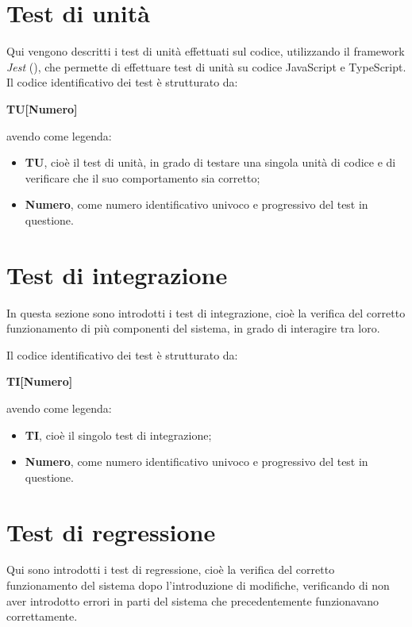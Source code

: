 \section{Test di unità}\label{sec:verifica-validazione-test}

Qui vengono descritti i test di unità effettuati sul codice, utilizzando il framework \textit{Jest} (\cite{site:jest}), che permette di effettuare test di unità su codice JavaScript e TypeScript.
Il codice identificativo dei test è strutturato da:
\begin{center}
    \textbf{TU[Numero]}
  \end{center}
\textbf{}
avendo come legenda:
\begin{itemize}
\item \textbf{TU}, cioè il test di unità, in grado di testare una singola unità di codice e di verificare che il suo comportamento sia corretto;
\item \textbf{Numero}, come numero identificativo univoco e progressivo del test in questione.
\end{itemize}

\section{Test di integrazione}\label{sec:verifica-validazione-integrazione}

In questa sezione sono introdotti i test di integrazione, cioè la verifica del corretto funzionamento di più componenti del sistema, in grado di interagire tra loro.

Il codice identificativo dei test è strutturato da:
\begin{center}
    \textbf{TI[Numero]}
  \end{center}
\textbf{}
avendo come legenda:
\begin{itemize}
\item \textbf{TI}, cioè il singolo test di integrazione;
\item \textbf{Numero}, come numero identificativo univoco e progressivo del test in questione.
\end{itemize}

\section{Test di regressione}\label{sec:verifica-validazione-regressione}

Qui sono introdotti i test di regressione, cioè la verifica del corretto funzionamento del sistema dopo l'introduzione di modifiche, verificando di non aver 
introdotto errori in parti del sistema che precedentemente funzionavano correttamente.


